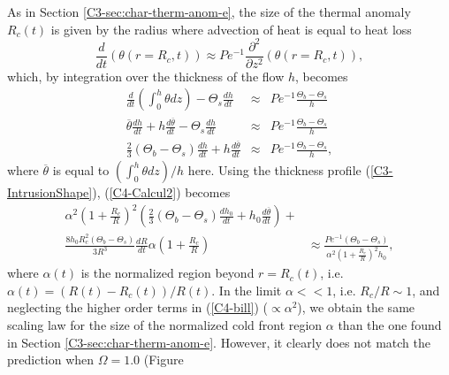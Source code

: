 As in Section \ref{C3-sec:char-therm-anom-e},  the size of the thermal
anomaly $R_c(t)$  is given by  the radius  where advection of  heat is
equal to heat loss
\begin{equation}
  \frac{d}{d    t}\left(\theta(r=   R_c,t)\right)    \approx   Pe^{-1}
  \frac{\partial^2}{\partial z^2}\left(\theta(r=R_c,t)\right),
  \label{C4-HeatequationThermal}
\end{equation}
which, by integration over the thickness of the flow $h$, becomes
\begin{eqnarray}
  \frac{d}{dt}\left(\int_0^h\theta           dz\right)-\Theta_s\frac{d
  h}{dt}&\approx& Pe^{-1} \frac{\Theta_b-\Theta_s}{h}\nonumber\\
  \overline{\theta}\frac{d h}{dt}+h\frac{d \overline{\theta}}{dt}-\Theta_s\frac{d
  h}{dt}&\approx& Pe^{-1}
                  \frac{\Theta_b-\Theta_s}{h}\nonumber\\
  \frac{2}{3}\left(\Theta_b-\Theta_s\right)\frac{d h}{d t} +h\frac{d\overline{\theta}}{dt}&\approx& Pe^{-1}
                                                                                                    \frac{\Theta_b-\Theta_s}{h},\label{C4-Calcul2}
\end{eqnarray}
where $\overline{\theta}$  is equal to $(\int_0^h  \theta dz)/h$ here.
Using     the     thickness     profile     (\ref{C3-IntrusionShape}),
(\ref{C4-Calcul2}) becomes
\begin{eqnarray}
  \alpha^2\left(1+\frac{R_c}{R}\right)^2\left(\frac{2}{3}\left(\Theta_b-\Theta_s\right)\frac{d h_0}{d
  t}+h_0\frac{d \overline{\theta}}{d
  t}\right)+&\nonumber\\
  \frac{8h_0R_c^2\left(\Theta_b-\Theta_s\right)}{3R^3}\frac{d
  R}{d
  t}\alpha\left(1+\frac{R_c}{R}\right)                        &\approx
                                                                \frac{Pe^{-1}\left(\Theta_b-\Theta_s\right)}{\alpha^2\left(1+\frac{R_c}{R}\right)^2h_0},
                                                                \label{C4-bill}
\end{eqnarray}
where $\alpha  (t)$ is the  normalized region beyond  $r=R_c(t)$, i.e.
$\alpha(t)= \left(R(t)-R_c(t)\right)/R(t)$. In  the limit $\alpha<<1$,
i.e.   $R_c/R\sim  1$,  and  neglecting  the  higher  order  terms  in
(\ref{C4-bill}) ($\propto  \alpha^2$), we obtain the  same scaling law
for the size of the normalized cold front region $\alpha$ than the one
found in Section  \ref{C3-sec:char-therm-anom-e}.  However, it clearly
does   not   match   the    prediction   when   $\Omega=1.0$   (Figure
